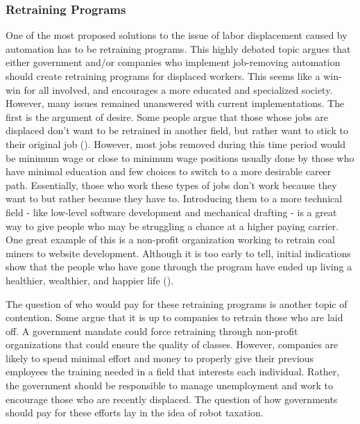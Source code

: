 \subsubsection{Retraining Programs}
One of the most proposed solutions to the issue of labor displacement caused by automation has to be retraining programs. This highly debated topic argues that either government and/or companies who implement job-removing automation should create retraining programs for displaced workers. This seems like a win-win for all involved, and encourages a more educated and specialized society. However, many issues remained unanswered with current implementations. The first is the argument of desire. Some people argue that those whose jobs are displaced don't want to be retrained in another field, but rather want to stick to their original job (\cite{miller2017beatRobots}). However, most jobs removed during this time period would be minimum wage or close to minimum wage positions usually done by those who have minimal education and few choices to switch to a more desirable career path. Essentially, those who work these types of jobs don't work because they want to but rather because they have to. Introducing them to a more technical field - like low-level software development and mechanical drafting - is a great way to give people who may be struggling a chance at a higher paying carrier. One great example of this is a non-profit organization working to retrain coal miners to website development. Although it is too early to tell, initial indications show that the people who have gone through the program have ended up living a healthier, wealthier, and happier life (\cite{phamRetrainingUnemployed}).

The question of who would pay for these retraining programs is another topic of contention. Some argue that it is up to companies to retrain those who are laid off. A government mandate could force retraining through non-profit organizations that could ensure the quality of classes. However, companies are likely to spend minimal effort and money to properly give their previous employees the training needed in a field that interests each individual. Rather, the government should be responsible to manage unemployment and work to encourage those who are recently displaced. The question of how governments should pay for these efforts lay in the idea of robot taxation. 

